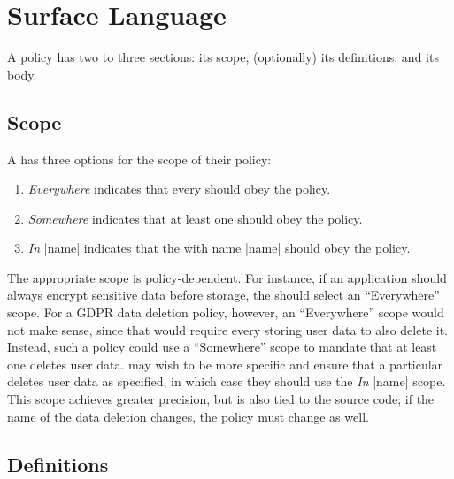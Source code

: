 \section{Surface Language}
\label{sec:interface}

A \syslang{} policy has two to three sections: its scope, (optionally) its definitions, and its body.

\subsection{Scope}
\label{sec:scope}

A \ce{} has three options for the scope of their policy:
%
\begin{enumerate}[nosep]
    \item \emph{Everywhere} indicates that every \controller{} should obey the policy.
    \item \emph{Somewhere} indicates that at least one \controller{} should obey the policy.
    \item \emph{In} |name| indicates that the \controller{} with name |name| should obey the policy.
\end{enumerate}

The appropriate scope is policy-dependent.
%
For instance, if an application should always encrypt sensitive data before storage,
the \ce{} should select an ``Everywhere'' scope.
%
For a GDPR data deletion policy, however, an ``Everywhere'' scope would not make sense, 
since that would require every \controller{} storing user data to also delete it.
%
Instead, such a policy could use a ``Somewhere'' scope to mandate that at least one \controller{} deletes user data.
%
\Ces{} may wish to be more specific and ensure that a particular \controller{} deletes user data as specified,
in which case they should use the \emph{In} |name| scope.
%
This scope achieves greater precision, but is also tied to the source code; if the name of the data deletion \controller{} changes, the policy must change as well.
%

\subsection{Definitions}
\label{sec:definitions}

